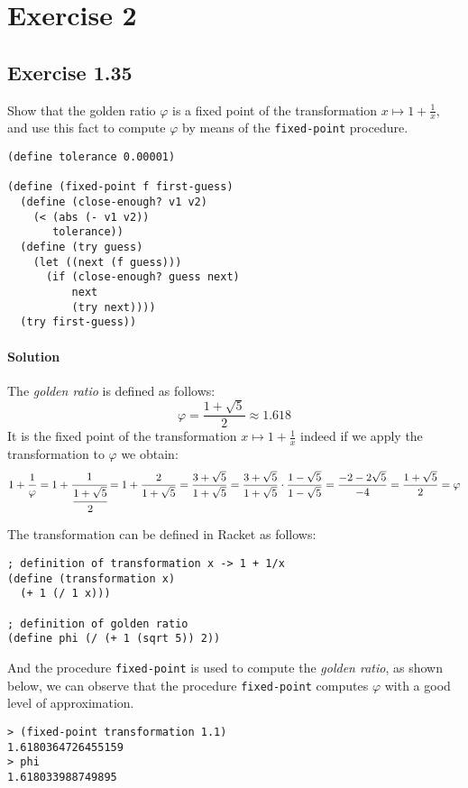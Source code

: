 \section*{Exercise 2}

\subsection*{Exercise 1.35}
Show that the golden ratio $ \varphi $ is a fixed point of the transformation $ x \mapsto 1 + \frac{1}{x} $, and use this fact
to compute $ \varphi $ by means of the \texttt{fixed-point} procedure.

\begin{lstlisting}
(define tolerance 0.00001)

(define (fixed-point f first-guess)
  (define (close-enough? v1 v2)
    (< (abs (- v1 v2))
       tolerance))
  (define (try guess)
    (let ((next (f guess)))
      (if (close-enough? guess next)
          next
          (try next))))
  (try first-guess))
\end{lstlisting}

\paragraph{Solution}
The \textit{golden ratio} is defined as follows: \[ \varphi = \frac{1 + \sqrt{5}}{2} \approx 1.618 \]
It is the fixed point of the transformation $ x \mapsto 1 + \frac{1}{x} $ indeed if we apply the transformation to $ \varphi $
we obtain:
\[ 
    1 + \frac{1}{\varphi} = 1 + \cfrac{1}{\cfrac{1 + \sqrt{5}}{2}} = 1 + \frac{2}{1 + \sqrt{5}} = \frac{3 + \sqrt{5}}{1 + \sqrt{5}} 
    = \frac{3 + \sqrt{5}}{1 + \sqrt{5}} \cdot \frac{1 - \sqrt{5}}{1 - \sqrt{5}} = \frac{-2 - 2\sqrt{5}}{-4} =
    \frac{1 + \sqrt{5}}{2} = \varphi
\]

The transformation can be defined in Racket as follows:
\begin{lstlisting}
; definition of transformation x -> 1 + 1/x
(define (transformation x)
  (+ 1 (/ 1 x)))

; definition of golden ratio
(define phi (/ (+ 1 (sqrt 5)) 2))
\end{lstlisting}
And the procedure \texttt{fixed-point} is used to compute the \textit{golden ratio}, as shown below, we can observe that the procedure
\texttt{fixed-point} computes $ \varphi $ with a good level of approximation.
\begin{lstlisting}
> (fixed-point transformation 1.1)
1.6180364726455159
> phi
1.618033988749895
\end{lstlisting}

